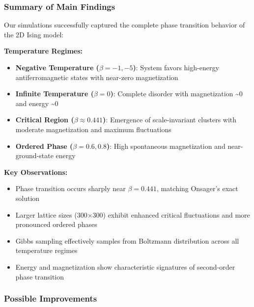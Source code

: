 \documentclass[11pt]{article}
\providecommand{\tightlist}{%
      \setlength{\itemsep}{0pt}\setlength{\parskip}{0pt}}
\begin{document}
\subsubsection{Summary of Main Findings}\label{summary-of-main-findings}

Our simulations successfully captured the complete phase transition
behavior of the 2D Ising model:

\textbf{Temperature Regimes:}

\begin{itemize}
\tightlist
\item
  \textbf{Negative Temperature (\(\beta = -1, -5\))}: System favors
  high-energy antiferromagnetic states with near-zero magnetization
\item
  \textbf{Infinite Temperature (\(\beta = 0\))}: Complete disorder with
  magnetization \textasciitilde0 and energy \textasciitilde0
\item
  \textbf{Critical Region (\(\beta \approx 0.441\))}: Emergence of
  scale-invariant clusters with moderate magnetization and maximum
  fluctuations
\item
  \textbf{Ordered Phase (\(\beta = 0.6, 0.8\))}: High spontaneous
  magnetization and near-ground-state energy
\end{itemize}

\textbf{Key Observations:}

\begin{itemize}
\tightlist
\item
  Phase transition occurs sharply near \(\beta = 0.441\), matching
  Onsager's exact solution
\item
  Larger lattice sizes (300×300) exhibit enhanced critical fluctuations
  and more pronounced ordered phases
\item
  Gibbs sampling effectively samples from Boltzmann distribution across
  all temperature regimes
\item
  Energy and magnetization show characteristic signatures of
  second-order phase transition
\end{itemize}

\subsubsection{Possible Improvements}\label{possible-improvements}
\end{document}
